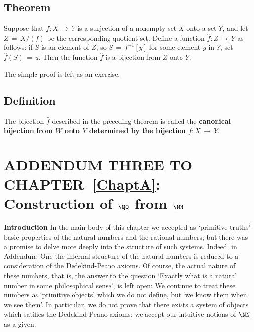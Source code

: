 {\V
\V

        \subsection{\small{{\bf Theorem}}}
                \label{ThmA50.125}

        Suppose that $f:X \,{\rightarrow}\, Y$ is a surjection of a nonempty set $X$ onto a set $Y$,
    and let $Z \,=\, X/(f)$ be the corresponding quotient set.
    Define a function $\hat{f}:Z \,{\rightarrow}\, Y$ as follows: if $S$ is an element of $Z$, so $S \,=\, f^{-1}[y]$ for some element $y$ in $Y$, set $\hat{f}(S) \,=\, y$.
    Then the function $\hat{f}$ is a bijection from $Z$ onto $Y$.

\V

        The simple proof is left as an exercise.

\VV

        \subsection{\small{{\bf Definition}}}
                \label{DefA50.127}

        The bijection $\hat{f}$ described in the preceding theorem is called the {\bf canonical bijection from $W$ onto $Y$ determined by the bijection $f:X \,{\rightarrow}\, Y$}.

                        \section{ADDENDUM THREE TO CHAPTER~\ref{ChaptA}: Construction of ${\QQ}$ from ${\NN}$}
                        \label{SectAAdd3}
\VV

        {\bf Introduction} In the main body of this chapter we accepted as `primitive truths' basic properties of the natural numbers and the rational numbers;
    but there was a promise to delve more deeply into the structure of such systems.
    Indeed, in Addendum~One the internal structure of the natural numbers is reduced to a consideration of the Dedekind-Peano axioms.
    Of course, the actual nature of these numbers, that is, the answer to the question
    `Exactly what is a natural number in some philosophical sense', is left open:
    We continue to treat these numbers as `primitive objects' which we do not define, but `we know them when we see them'. In particular,
    we do not prove that there exists a system of objects which satifies the Dedekind-Peano axioms; we accept our intuitive notions of ${\NN}$ as a given.

}
